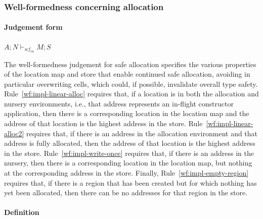 \documentclass[showabstract,showacknowledgments,showpreface,showdedication,school]{iuphd}
\theoremstyle{nonumberplain}
\newcommand{\keywd}[1]{\mathit{#1}}
\newcommand{\STOR}{\keywd{S}}
\newcommand{\MENV}{\keywd{M}}
\newcommand{\AENV}{\keywd{A}}
\newcommand{\NENV}{\keywd{N}}
\newcommand{\storewfca}[4]{\ensuremath{#1;#2 \vdash_{wf_{ca}} #3;#4}}
\begin{document}
\subsubsection{Well-formedness concerning allocation}
\label{sec:well-formedness-allocation}

\paragraph{Judgement form}

$\storewfca{\AENV}{\NENV}{\MENV}{\STOR}$

The well-formedness judgement for safe allocation specifies the various properties
of the location map and store that enable continued safe allocation, avoiding in particular
overwriting cells, which could, if possible, invalidate overall type safety.
Rule~\ref{wf:impl-linear-alloc} requires that, if a location is in both the allocation
and nursery environments, i.e., that address represents an in-flight
constructor application, then there is a corresponding location in the location
map and the address of that location is the highest address in the store.
Rule~\ref{wf:impl-linear-alloc2} requires that, if there is an address in the allocation
environment and that address is fully allocated, then the address of that location is the
highest address in the store.
Rule~\ref{wf:impl-write-once} requires that, if there is an address in the nursery, then
there is a corresponding location in the location map, but nothing at the corresponding
address in the store.
Finally, Rule~\ref{wf:impl-empty-region} requires that, if there is a region that has been
created but for which nothing has yet been allocated, then there can be no addresses
for that region in the store.

\paragraph{Definition}
\end{document}
